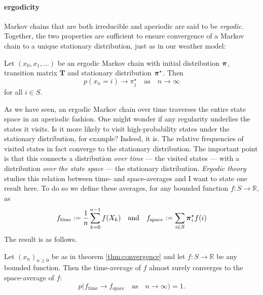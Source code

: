 \documentclass{../src/bcthesispart}
\begin{document}
\paragraph{ergodicity}

Markov chains that are both irreducible and aperiodic are said to be \emph{ergodic}.
Together, the two properties are sufficient to ensure convergence of a Markov chain to a unique stationary distribution, just as in our weather model:
\begin{theorem}
	\label{thm:convergence}
	Let $(x_0, x_1, \dots)$ be an ergodic Markov chain with initial distribution $\boldsymbol{\mathbf{\pi}}$, transition matrix $\mathbf{T}$ and stationary distribution $\boldsymbol{\mathbf{\pi}}^\star$. Then
	\begin{equation}
		p(x_n = i) \longrightarrow \pi_j^\star \quad \text{as} \quad n \longrightarrow \infty
	\end{equation}
	for all $i\in S$.
\end{theorem}




As we have seen, an ergodic Markov chain over time traverses the entire state space in an aperiodic fashion.
One might wonder if any regularity underlies the states it visits. 
Is it more likely to visit high-probability states under the stationary distribution, for example?
Indeed, it is.
The relative frequencies of visited states in fact converge to the stationary distribution. 
The important point is that this connects a distribution \emph{over time} — the visited states — with a distribution \emph{over the state space} — the stationary distribution.
\emph{Ergodic theory} studies this relation between time- and space-averages and I want to state one result here.
To do so we define these averages, for any bounded function $f: S \to \mathbb{R}$, as
\begin{equation}
	f_{\text{time}}	:= \frac{1}{n}\sum_{k=0}^{n-1} f(X_k)
		\quad\text{and}\quad
	f_{\text{space}} := \sum_{i\in S} \boldsymbol{\mathbf{\pi}}^\star_i f(i)
\end{equation}
The result is as follows.
\begin{theorem}
	Let $(x_n)_{n\ge 0}$ be as in theorem \ref{thm:convergence} and let $f: S \to \mathbb{R}$ be any bounded function. Then the time-average of $f$ almost surely converges to the space-average of $f$:
	\begin{equation}
		p\bigl(f_{\text{time}} \longrightarrow f_{\text{space}} \quad \text{as}\quad n \longrightarrow \infty \bigr) = 1.
	\end{equation}
\end{theorem}
\end{document}
